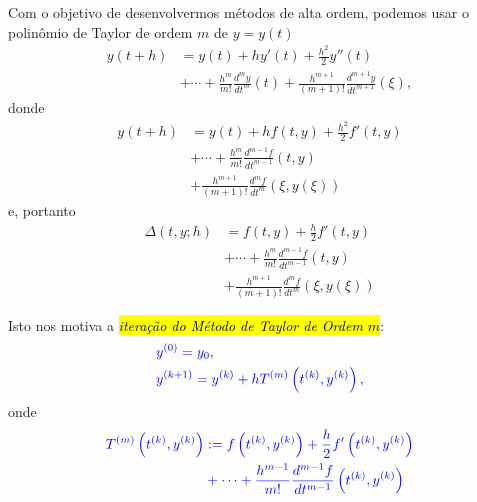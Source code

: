 Com o objetivo de desenvolvermos métodos de alta ordem, podemos usar o polinômio de Taylor de ordem $m$ de $y=y(t)$
\begin{equation}
  \begin{aligned}
    y(t+h) &= y(t) + hy'(t) + \frac{h^2}{2}y''(t)\\
    &+ \cdots + \frac{h^m}{m!}\frac{d^m y}{d t^m}(t) + \frac{h^{m+1}}{(m+1)!}\frac{d^{m+1} y}{d t^{m+1}}(\xi),
  \end{aligned}
\end{equation}
donde
\begin{equation}\label{cap_pvi_sec_taylor:eq:y_poli_taylor}
  \begin{aligned}
    y(t+h) &= y(t) + hf(t, y) + \frac{h^2}{2}f'(t, y) \\
    &+ \cdots + \frac{h^m}{m!}\frac{d^{m-1} f}{d t^{m-1}}(t, y) \\
    & + \frac{h^{m+1}}{(m+1)!}\frac{d^{m} f}{d t^{m}}\left(\xi, y(\xi)\right)
  \end{aligned}
\end{equation}
e, portanto
\begin{equation}\label{cap_pvi_sec_taylor:eq:delta_taylor}
  \begin{aligned}
    \Delta(t, y; h) &= f(t, y) + \frac{h}{2}f'(t, y) \\
    &+ \cdots + \frac{h^m}{m!}\frac{d^{m-1} f}{d t^{m-1}}(t, y) \\
    & + \frac{h^{m+1}}{(m+1)!}\frac{d^{m} f}{d t^{m}}\left(\xi, y(\xi)\right)
  \end{aligned}  
\end{equation}

Isto nos motiva a \hl{\emph{iteração do Método de Taylor de Ordem $m$}}:
\begin{subequations}\hleq
  \begin{align}
    &y^{(0)} = y_0,\\
    &y^{(k+1)} = y^{(k)} + hT^{(m)}\left(t^{(k)}, y^{(k)}\right),
  \end{align}  
\end{subequations}
onde
\begin{equation}\color{blue}\begin{aligned}
    T^{(m)}\left(t^{(k)}, y^{(k)}\right) &:= f\left(t^{(k)}, y^{(k)}\right) + \frac{h}{2}f'\left(t^{(k)}, y^{(k)}\right)\\
    &+ \cdots + \frac{h^{m-1}}{m!}\frac{d^{m-1} f}{d t^{m-1}}\left(t^{(k)}, y^{(k)}\right)
\end{aligned}
\end{equation}

